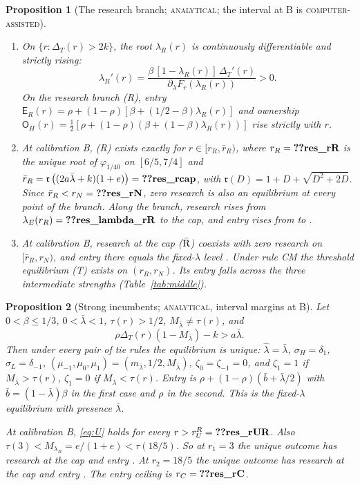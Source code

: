 \documentclass[12pt]{article}
\newtheorem{proposition}{Proposition}
\theoremstyle{definition}
\theoremstyle{remark}
\newcommand{\Ent}{\mathsf E}
\newcommand{\Own}{\mathsf O}
\newcommand{\fr}{\mathfrak r}
\newcommand{\DT}{\Delta_T}
\newcommand{\lh}{\hat\lambda}
\newcommand{\lb}{\bar\lambda}
\newcommand{\st}[1]{\textsc{#1}}
\begin{document}
\begin{proposition}[The research branch; \st{analytical}; the interval at B is \st{computer-assisted}]\label{prop:branch}
\begin{enumerate}[label=(\alph*),nosep]
\item On $\{r:\DT(r)>2k\}$, the root $\lambda_R(r)$ is continuously differentiable and strictly rising:
\begin{equation}\label{eq:dlam}
\lambda_R'(r)=\frac{\beta\,[1-\lambda_R(r)]\,\DT'(r)}{\partial_\lambda F_r(\lambda_R(r))}>0 .
\end{equation}
On the research branch (R), entry $\Ent_R(r)=\rho+(1-\rho)[\beta+(1/2-\beta)\lambda_R(r)]$ and ownership
$\Own_H(r)=\tfrac12[\rho+(1-\rho)(\beta+(1-\beta)\lambda_R(r))]$ rise strictly with $r$.
\item At calibration B, (R) exists exactly for $r\in[r_R,\bar r_R)$, where $r_R=\reg{res_rR}$ is the unique root of
$\varphi_{1/40}$ on $[6/5,7/4]$ and $\bar r_R=\fr\left((2a\lb+k)(1+e)\right)=\reg{res_rcap}$, with
$\fr(D)=1+D+\sqrt{D^2+2D}$. Since $\bar r_R<r_N=\reg{res_rN}$, zero research is also an equilibrium at every
point of the branch. Along the branch, research rises from $\lambda_E(r_R)=\reg{res_lambda_rR}$ to the cap, and
entry rises from  to .
\item At calibration B, research at the cap ($\bar{\rm R}$) coexists with zero research on $[\bar r_R,r_N)$, and
entry there equals the fixed-$\lambda$ level . Under rule CM the threshold equilibrium (T)
exists on $(r_R,r_N)$. Its entry falls across the three intermediate strengths
(Table~\ref{tab:middle}).
\end{enumerate}
\end{proposition}

\begin{proposition}[Strong incumbents; \st{analytical}, interval margins at B]\label{prop:strong}
Let $0<\beta\le1/3$, $0<\lb<1$, $\tau(r)>1/2$, $M_{\lb}\ne\tau(r)$, and
\begin{equation}\tag{U}\label{eq:U}
\rho\DT(r)\left(1-M_{\lb}\right)-k>a\lb .
\end{equation}
Then under every pair of tie rules the equilibrium is unique: $\lh=\lb$, $\sigma_H=\delta_1$, $\sigma_L=\delta_{-1}$,
$(\mu_{-1},\mu_0,\mu_1)=(m_{\lb},1/2,M_{\lb})$, $\zeta_0=\zeta_{-1}=0$, and $\zeta_1=1$ if $M_{\lb}>\tau(r)$,
$\zeta_1=0$ if $M_{\lb}<\tau(r)$. Entry is $\rho+(1-\rho)(\bar b+\lb/2)$ with $\bar b=(1-\lb)\beta$ in the first case
and $\rho$ in the second. This is the fixed-$\lambda$ equilibrium with presence $\lb$.

At calibration B, \eqref{eq:U} holds for every $r>r_U^R=\reg{res_rUR}$. Also $\tau(3)<M_{\lambda_B}=e/(1+e)<\tau(18/5)$.
So at $r_1=3$ the unique outcome has research at the cap and entry . At $r_2=18/5$ the unique
outcome has research at the cap and entry . The entry ceiling is $r_C=\reg{res_rC}$.
\end{proposition}
\end{document}
